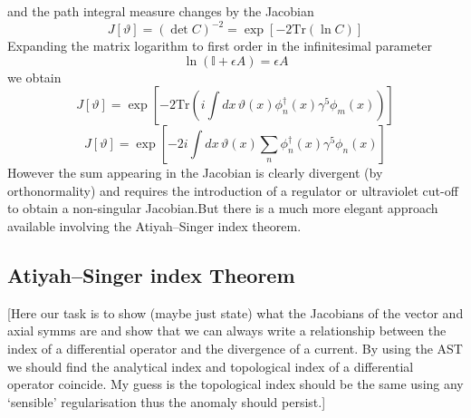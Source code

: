 \documentclass[11pt, a4paper]{article}
\theoremstyle{definition}
\theoremstyle{plain}
\begin{document}
and the path integral measure changes by the Jacobian
\begin{equation}
  J[\vartheta] = {(\det{C})}^{-2} = \exp\left[-2 \mathrm{Tr}(\ln{C}) \right]
\end{equation}
Expanding the matrix logarithm to first order in the infinitesimal parameter
\begin{equation}
  \ln{(\mathbb{I} + \epsilon A)} = \epsilon A
\end{equation}
we obtain
\begin{equation}
  J[\vartheta] = \exp{\left[-2\mathrm{Tr}\left(i
  \int{dx\,  \vartheta(x)\phi_{n}^{\dagger}(x)\gamma^5\phi_m(x)} \right) \right]}
\end{equation}
\begin{equation}
  J[\vartheta] = \exp{\left[ -2i
  \int{dx\,\vartheta(x) \sum_n{\phi_{n}^{\dagger}(x)\gamma^5\phi_n(x)}} \right]}
\end{equation}
However the sum appearing in the Jacobian is clearly divergent (by orthonormality)
and requires the introduction of a regulator or ultraviolet cut-off to obtain a
non-singular Jacobian.But there is a much more elegant approach available involving 
the Atiyah–Singer index theorem.

\subsection{Atiyah–Singer index Theorem}

[Here our task is to show (maybe just state) what the Jacobians of the vector and axial 
symms are and show that we can always write a relationship between the
index of a differential operator and the divergence of a current. By using
the AST we should find the analytical index and topological index of
a differential operator coincide. My guess is the topological index should
be the same using any `sensible' regularisation thus the anomaly should
persist.]
\end{document}
